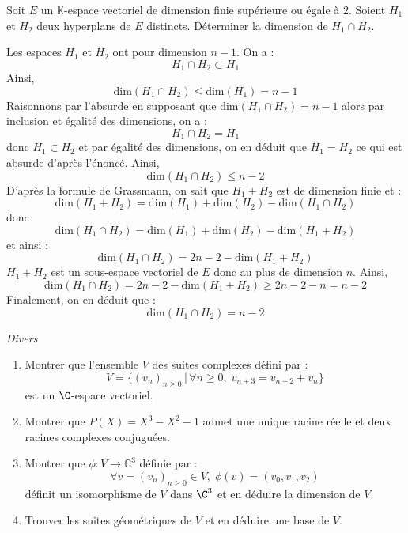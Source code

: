\documentclass[a4paper,10pt]{report}
\begin{document}
\medskip



\begin{Exa} Soit $E$ un $\mathbb{K}$-espace vectoriel de dimension finie supérieure ou égale à 2. Soient $H_1$ et $H_2$ deux hyperplans de $E$ distincts. Déterminer la dimension de $H_1 \cap H_2$.
\end{Exa}

\corr Les espaces $H_1$ et $H_2$ ont pour dimension $n-1$. On a :
$$ H_1 \cap H_2 \subset H_1$$
Ainsi, 
$$ \textrm{dim}(H_1 \cap H_2) \leq  \textrm{dim}(H_1) = n-1$$
Raisonnons par l'absurde en supposant que $\textrm{dim}(H_1 \cap H_2) = n-1$ alors par inclusion et égalité des dimensions, on a :
$$ H_1 \cap H_2 = H_1$$
donc $H_1 \subset H_2$ et par égalité des dimensions, on en déduit que $H_1 = H_2$ ce qui est absurde d'après l'énoncé. Ainsi,
$$  \textrm{dim}(H_1 \cap H_2) \leq n-2$$
D'après la formule de Grassmann, on sait que $H_1+H_2$ est de dimension finie et :
$$  \textrm{dim}(H_1 + H_2) =  \textrm{dim}(H_1)  +  \textrm{dim}(H_2) -  \textrm{dim}(H_1 \cap H_2) $$
donc 
$$  \textrm{dim}(H_1 \cap H_2) =  \textrm{dim}(H_1)  +  \textrm{dim}(H_2) -  \textrm{dim}(H_1 + H_2) $$
et ainsi :
$$\textrm{dim}(H_1 \cap H_2) =  2n-2 -  \textrm{dim}(H_1 + H_2) $$
$H_1+H_2$ est un sous-espace vectoriel de $E$ donc au plus de dimension $n$. Ainsi,
$$\textrm{dim}(H_1 \cap H_2) =  2n-2 -  \textrm{dim}(H_1 + H_2) \geq 2n-2-n = n-2$$
Finalement, on en déduit que :
$$ \textrm{dim}(H_1 \cap H_2) =  n-2 $$


\medskip

\begin{center}
\textit{{ {\large Divers}}}
\end{center}

\medskip

\begin{Exa} \begin{enumerate}
 \item Montrer que l'ensemble $V$ des suites complexes défini par :
 $$ V = \lbrace (v_n)_{n \geq 0} \, \vert \, \forall n \geq 0, \; v_{n+3}=v_{n+2}+v_n \rbrace$$
est un $\C$-espace vectoriel.
 \item Montrer que $P(X)=X^3-X^2-1$ admet une unique racine réelle et deux racines complexes conjuguées.
 \item Montrer que $\phi : V \rightarrow \mathbb{C}^3$ définie par :
 $$ \forall v=(v_n)_{n \geq 0} \in V, \;\phi(v)=(v_0,v_1,v_2)$$
  définit un isomorphisme de $V$ dans $\C^3$ et en déduire la dimension de $V$.
 \item Trouver les suites géométriques de $V$ et en déduire une base de $V$.
\end{enumerate}
\end{Exa}
\end{document}
